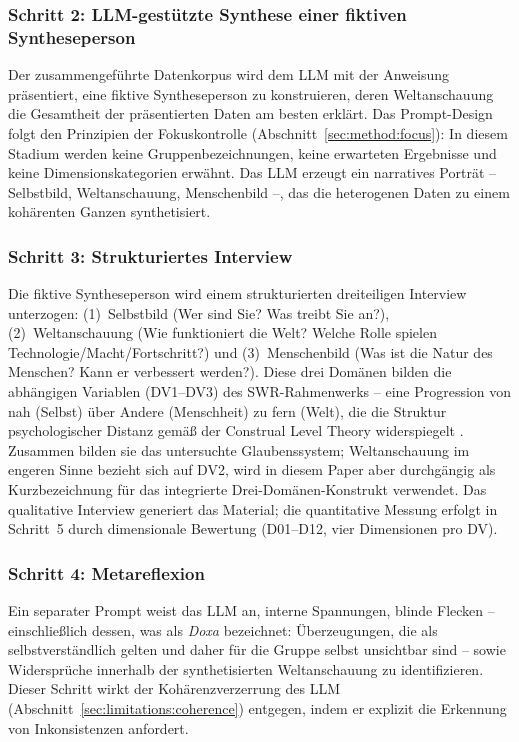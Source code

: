 \documentclass[11pt,a4paper]{article}
\begin{document}
\subsubsection{Schritt 2: LLM-gest\"utzte Synthese einer fiktiven Syntheseperson}

Der zusammengef\"uhrte Datenkorpus wird dem LLM mit der Anweisung pr\"asentiert, eine fiktive Syntheseperson zu konstruieren, deren Weltanschauung die Gesamtheit der pr\"asentierten Daten am besten erkl\"art. Das Prompt-Design folgt den Prinzipien der Fokuskontrolle (Abschnitt~\ref{sec:method:focus}): In diesem Stadium werden keine Gruppenbezeichnungen, keine erwarteten Ergebnisse und keine Dimensionskategorien erw\"ahnt. Das LLM erzeugt ein narratives Portr\"at -- Selbstbild, Weltanschauung, Menschenbild --, das die heterogenen Daten zu einem koh\"arenten Ganzen synthetisiert.

\subsubsection{Schritt 3: Strukturiertes Interview}

Die fiktive Syntheseperson wird einem strukturierten dreiteiligen Interview unterzogen: (1)~Selbstbild (\glqq{}Wer sind Sie? Was treibt Sie an?\grqq{}), (2)~Weltanschauung (\glqq{}Wie funktioniert die Welt? Welche Rolle spielen Technologie/Macht/Fortschritt?\grqq{}) und (3)~Menschenbild (\glqq{}Was ist die Natur des Menschen? Kann er verbessert werden?\grqq{}). Diese drei Dom\"anen bilden die abh\"angigen Variablen (DV1--DV3) des SWR-Rahmenwerks -- eine Progression von nah (Selbst) \"uber Andere (Menschheit) zu fern (Welt), die die Struktur psychologischer Distanz gem\"a\ss{} der Construal Level Theory widerspiegelt \citep{TropeLiberman2010}. Zusammen bilden sie das untersuchte Glaubenssystem; \glqq{}Weltanschauung\grqq{} im engeren Sinne bezieht sich auf DV2, wird in diesem Paper aber durchg\"angig als Kurzbezeichnung f\"ur das integrierte Drei-Dom\"anen-Konstrukt verwendet. Das qualitative Interview generiert das Material; die quantitative Messung erfolgt in Schritt~5 durch dimensionale Bewertung (D01--D12, vier Dimensionen pro DV).

\subsubsection{Schritt 4: Metareflexion}

Ein separater Prompt weist das LLM an, interne Spannungen, blinde Flecken -- einschlie\ss{}lich dessen, was \citet{Bourdieu1977} als \emph{Doxa} bezeichnet: \"Uberzeugungen, die als selbstverst\"andlich gelten und daher f\"ur die Gruppe selbst unsichtbar sind -- sowie Widerspr\"uche innerhalb der synthetisierten Weltanschauung zu identifizieren. Dieser Schritt wirkt der Koh\"arenzverzerrung des LLM (Abschnitt~\ref{sec:limitations:coherence}) entgegen, indem er explizit die Erkennung von Inkonsistenzen anfordert.
\end{document}
